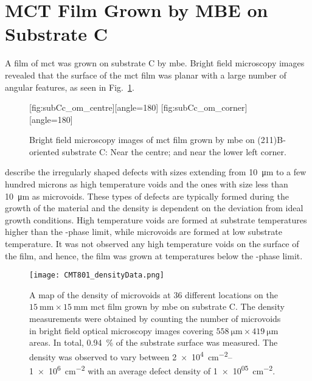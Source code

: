 \clearpage
\section{MCT Film Grown by MBE on  Substrate C}\label{sec:subCc}

A film of \acl{mct} was grown on substrate C by \ac{mbe}. Bright field microscopy images revealed that the surface of the \ac{mct} film was planar with a large number of angular features, as seen in Fig.~\ref{fig:subCc_om}.

\begin{figure}[htbp]
    \centering
    [fig:subCc_om_centre][angle=180]
    \hfill
    [fig:subCc_om_corner][angle=180]
    \caption[Bright field microscopy images of \ac{mct} film grown by \ac{mbe} on substrate AC]{Bright field microscopy images of \ac{mct} film grown by \ac{mbe} on (211)B-oriented substrate C:  Near the centre; and  near the lower left corner.}
    \label{fig:subCc_om}
\end{figure}

\citet{selvig2007defects} describe the irregularly shaped defects with sizes extending from \SI{10}{\micro\metre} to a few hundred microns as high temperature voids and the ones with size less than \SI{10}{\micro\metre} as microvoids. These types of defects are typically formed during the growth of the material and the density is dependent on the deviation from ideal growth conditions. High temperature voids are formed at substrate temperatures higher than the -phase limit, while microvoids are formed at low substrate temperature. It was not observed any high temperature voids on the surface of the film, and hence, the film was grown at temperatures below the -phase limit.


\begin{figure}[htbp]
    \centering
    \texttt{[image: CMT801\_densityData.png]}
    \caption[Map of the density of microvoids on the \ac{mct} film grown on substrate C.]{A map of the density of microvoids at 36 different locations on the $\SI{15}{\milli\metre}\times\SI{15}{\milli\metre}$ \ac{mct} film grown by \ac{mbe} on substrate C. The density measurements were obtained by counting the number of microvoids in bright field optical microscopy images covering $\SI{558}{\micro\metre}\times\SI{419}{\micro\metre}$ areas. In total, \SI{0.94}{\percent} of the substrate surface was measured. The density was observed to vary between \SIrange{2e+4}{1e+6}{\centi\metre^{-2}} with an average defect density of \SI{1e+05}{\centi\metre^{-2}}.}
    \label{fig:CMT801_densityData}
\end{figure}

